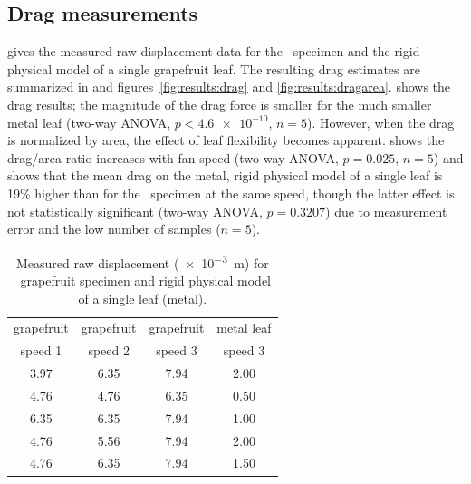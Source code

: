 \subsection{Drag measurements}
 gives the measured raw displacement data for the \Cxparadisi\ specimen and the rigid physical model of a single grapefruit leaf. The resulting drag estimates are summarized in  and figures~\ref{fig:results:drag} and \ref{fig:results:dragarea}.  shows the drag results; the magnitude of the drag force is smaller for the much smaller metal leaf (two-way ANOVA, $p<\num{4.6e-10}$, $n=5$). However, when the drag is normalized by area, the effect of leaf flexibility becomes apparent.  shows the drag/area ratio increases with fan speed (two-way ANOVA, $p=0.025$, $n=5$) and shows that the mean drag on the metal, rigid physical model of a single leaf is 19\% higher than for the \Cxparadisi\ specimen at the same speed, though the latter effect is not statistically significant (two-way ANOVA, $p=0.3207$) due to measurement error and the low number of samples ($n=5$).
\clearpage 
\begin{table}
\caption{Measured raw displacement (\SI{e-3}{\meter}) for \Cxparadisi\ grapefruit specimen and rigid physical model of a single leaf (metal).}
\label{tab:results:displacement}
\begin{center}
\begin{tabular}{cccc}
\toprule
grapefruit & grapefruit & grapefruit & metal leaf \\
speed 1 & speed 2 & speed 3 & speed 3 \\ 
\midrule
3.97 & 6.35 & 7.94 & 2.00 \\ %
4.76 & 4.76 & 6.35 & 0.50 \\
6.35 & 6.35 & 7.94 & 1.00 \\
4.76 & 5.56 & 7.94 & 2.00 \\
4.76 & 6.35 & 7.94 & 1.50 \\
\bottomrule
\end{tabular}
\end{center}
\end{table}
